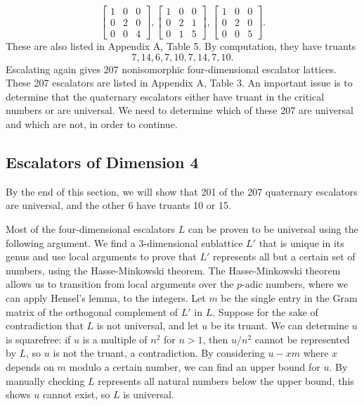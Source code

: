 \documentclass[letterpaper, 12pt]{article}
\begin{document}
\[\begin{bmatrix} 1 & 0 & 0 \\ 0 & 2 & 0 \\ 0 & 0 & 4 \end{bmatrix}, \begin{bmatrix} 1 & 0 & 0 \\ 0 & 2 & 1 \\ 0 & 1 & 5 \end{bmatrix}, \begin{bmatrix} 1 & 0 & 0 \\ 0 & 2 & 0 \\ 0 & 0 & 5 \end{bmatrix}.\]
These are also listed in Appendix A, Table 5.
By computation, they have truants
\[7, 14, 6, 7, 10, 7, 14, 7, 10.\]
Escalating again gives $207$ nonisomorphic four-dimensional escalator lattices. These 207 escalators are listed in Appendix A, Table 3. An important issue is to determine that the quaternary escalators either have truant in the critical numbers or are universal. We need to determine which of these 207 are universal and which are not, in order to continue.

\subsection{Escalators of Dimension 4}
By the end of this section, we will show that 201 of the 207 quaternary escalators are universal, and the other 6 have truants 10 or 15.

Most of the four-dimensional escalators $L$ can be proven to be universal using the following argument.
We find a $3$-dimensional sublattice $L'$ that is unique in its genus and use local arguments to prove that $L'$ represents all but a certain set of numbers, using the Hasse-Minkowski theorem. The Hasse-Minkowski theorem allows us to transition from local arguments over the $p$-adic numbers, where we can apply Hensel's lemma, to the integers.
Let $m$ be the single entry in the Gram matrix of the orthogonal complement of $L'$ in $L$.
Suppose for the sake of contradiction that $L$ is not universal, and let $u$ be its truant.
We can determine $u$ is squarefree: if $u$ is a multiple of $n^2$ for $n > 1$, then $u/n^2$ cannot be represented by $L$, so $u$ is not the truant, a contradiction. By considering $u - xm$ where $x$ depends on $m$ modulo a certain number, we can find an upper bound for $u$.
By manually checking $L$ represents all natural numbers below the upper bound, this shows $u$ cannot exist, so $L$ is universal.
\end{document}
